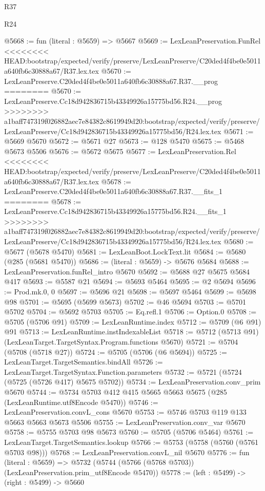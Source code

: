 \begin{lexlean}{R37}
\begin{lexlean}{R24}
\begin{coremodule}
{{{{{{{{{{{{{{{{{{{{{{{{{{{{{{{{{{{{{{{{{{{{{{{{{{{{{{{{{{{{{{{{{{{{{{{{{{{{{{{{{{{{{{{{{{{{{{{{{{{{{{{{{{{{{{{{{{{{{{{{{{{{{{{{{{{{{{{{{{{{{{{{{{{{{{{{{{{{{{{{{{{{{{{{{{{{{{{{{{{{{{{{{@5668 := fun (literal : @5659) => @5667
@5669 := LexLeanPreservation.FunRel
<<<<<<<< HEAD:bootstrap/expected/verify/preserve/LexLeanPreserve/C20ded4f4be0e5011a640fb6c30888a67/R37.lex.tex
@5670 := LexLeanPreserve.C20ded4f4be0e5011a640fb6c30888a67.R37.__prog
========
@5670 := LexLeanPreserve.Cc18d942836715b43349926a15775bd56.R24.__prog
>>>>>>>> a1baff747319f026882aec7e84382c8619949d20:bootstrap/expected/verify/preserve/LexLeanPreserve/Cc18d942836715b43349926a15775bd56/R24.lex.tex
@5671 := @5669 @5670
@5672 := @5671 @27
@5673 := @128 @5470
@5675 := @5468 @5673 @5506
@5676 := @5672 @5675
@5677 := LexLeanPreservation.Rel
<<<<<<<< HEAD:bootstrap/expected/verify/preserve/LexLeanPreserve/C20ded4f4be0e5011a640fb6c30888a67/R37.lex.tex
@5678 := LexLeanPreserve.C20ded4f4be0e5011a640fb6c30888a67.R37.__fits_1
========
@5678 := LexLeanPreserve.Cc18d942836715b43349926a15775bd56.R24.__fits_1
>>>>>>>> a1baff747319f026882aec7e84382c8619949d20:bootstrap/expected/verify/preserve/LexLeanPreserve/Cc18d942836715b43349926a15775bd56/R24.lex.tex
@5680 := @5677 (@5678 @5470)
@5681 := LexLeanBoot.LockText.lit
@5684 := @5680 (@285 (@5681 @5470))
@5686 := (literal : @5659) -> @5676 @5684
@5688 := LexLeanPreservation.funRel_intro @5670
@5692 := @5688 @27 @5675 @5684 @417
@5693 := @5587 @21
@5694 := @5693 @5464
@5695 := @2 @5694
@5696 := Prod.mk.{0, 0}
@5697 := @5696 @21
@5698 := @5697 @5464
@5699 := @5698 @98
@5701 := @5695 (@5699 @5673)
@5702 := @46 @5694
@5703 := @5701 @5702
@5704 := @5692 @5703
@5705 := Eq.refl.{1}
@5706 := Option.{0}
@5708 := @5705 (@5706 @91)
@5709 := LexLeanRuntime.index
@5712 := @5709 (@6 @91) @91
@5713 := LexLeanRuntime.instIndexableList
@5718 := @5712 (@5713 @91) (LexLeanTarget.TargetSyntax.Program.functions @5670)
@5721 := @5704 (@5708 (@5718 @27))
@5724 := @5705 (@5706 (@6 @5694))
@5725 := LexLeanTarget.TargetSemantics.bindAll
@5726 := LexLeanTarget.TargetSyntax.Function.parameters
@5732 := @5721 (@5724 (@5725 (@5726 @417) @5675 @5702))
@5734 := LexLeanPreservation.conv_prim @5670
@5744 := @5734 @5703 @412 @415 @5665 @5663 @5675 (@285 (LexLeanRuntime.utf8Encode @5470))
@5746 := LexLeanPreservation.convL_cons @5670
@5753 := @5746 @5703 @119 @133 @5663 @5663 @5673 @5506
@5755 := LexLeanPreservation.conv_var @5670
@5758 := @5755 @5703 @98 @5673
@5760 := @5705 (@5706 @5464)
@5761 := LexLeanTarget.TargetSemantics.lookup
@5766 := @5753 (@5758 (@5760 (@5761 @5703 @98)))
@5768 := LexLeanPreservation.convL_nil @5670
@5776 := fun (literal : @5659) =>
  @5732 (@5744 (@5766 (@5768 @5703)) (LexLeanPreservation.prim_utf8Encode @5470))
@5778 := (left : @5499) -> (right : @5499) -> @5660
}}}}}}}}}}}}}}}}}}}}}}}}}}}}}}}}}}}}}}}}}}}}}}}}}}}}}}}}}}}}}}}}}}}}}}}}}}}}}}}}}}}}}}}}}}}}}}}}}}}}}}}}}}}}}}}}}}}}}}}}}}}}}}}}}}}}}}}}}}}}}}}}}}}}}}}}}}}}}}}}}}}}}}}}}}}}}}}}}}}}}}}}}
\end{coremodule}
\end{lexlean}
\end{lexlean}
